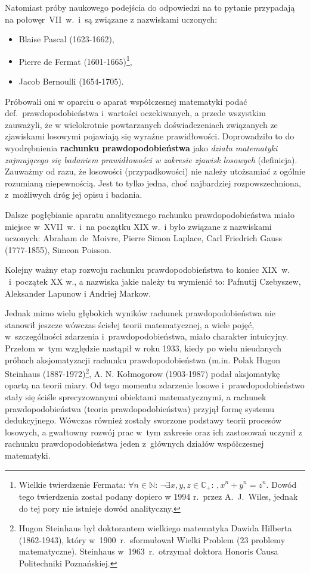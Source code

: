 \documentclass[10pt,a4paper]{article}
\begin{document}
Natomiast próby naukowego podejścia do odpowiedzi na to pytanie przypadają
na połowęr~VII~w.\ i~są związane z nazwiskami uczonych:
\begin{itemize}
  \item Blaise Pascal (1623-1662),
  \item Pierre de Fermat (1601-1665)\footnote{Wielkie twierdzenie Fermata:
      $\forall n\in\mathbb{N}:\,\neg\exists x,y,z\in\mathbb{C}_+:\,,x^n+y^n=z^n$.
      Dowód tego twierdzenia został podany dopiero w 1994 r.\ przez A.\ J.\ Wiles,
      jednak do tej pory nie istnieje dowód analityczny.},
  \item Jacob Bernoulli (1654-1705).
\end{itemize}


Próbowali oni w oparciu o aparat współczesnej matematyki podać
def.~prawdopodobieństwa i~wartości oczekiwanych, a przede wszystkim zauważyli,
że w wielokrotnie powtarzanych doświadczeniach związanych ze zjawiskami losowymi
pojawiają się wyraźne prawidłowości. Doprowadziło to do wyodrębnienia
\textbf{rachunku prawdopodobieństwa} jako \textit{działu matematyki zajmującego
  się badaniem prawidłowości w zakresie zjawisk losowych} (definicja). Zauważmy
od razu, że losowości (przypadkowości) nie należy utożsamiać z ogólnie rozumianą
niepewnością. Jest to tylko jedna, choć najbardziej rozpowszechniona,
z~możliwych dróg jej opisu i badania.

Dalsze pogłębianie aparatu analitycznego rachunku prawdopodobieństwa miało
miejsce w~XVII~w.\ i~na początku XIX w.\ i było związane z nazwiskami uczonych:
Abraham de~Moivre, Pierre Simon Laplace, Carl Friedrich Gauss (1777-1855),
Simeon Poisson.

Kolejny ważny etap rozwoju rachunku prawdopodobieństwa to koniec XIX~w.
\ i~początek XX w., a nazwiska jakie należy tu wymienić to:
Pafnutij Czebyszew, Aleksander Lapunow i Andriej Markow.

Jednak mimo wielu głębokich wyników rachunek prawdopodobieństwa nie stanowił
jeszcze wówczas ścisłej teorii matematycznej, a wiele pojęć, w~szczególności
zdarzenia i~prawdopodobieństwa, miało charakter intuicyjny. Przełom w~tym
względzie nastąpił w roku 1933, kiedy po wielu nieudanych próbach aksjomatyzacji
rachunku prawdopodobieństwa (m.in. Polak Hugon Steinhaus (1887-1972)\footnote{Hugon
Steinhaus był doktorantem wielkiego matematyka Dawida Hilberta (1862-1943),
który w~1900~r.\ sformułował Wielki Problem (23 problemy matematyczne). Steinhaus
w~1963~r.\ otrzymał doktora Honoris Causa Politechniki Poznańskiej.},
A. N. Kołmogorow (1903-1987) podał aksjomatykę opartą na teorii
miary.  Od tego momentu zdarzenie losowe i~prawdopodobieństwo stały się ściśle
sprecyzowanymi obiektami matematycznymi, a rachunek prawdopodobieństwa (teoria
prawdopodobieństwa) przyjął formę systemu dedukcyjnego. Wówczas również zostały
sworzone podstawy teorii procesów losowych, a gwałtowny rozwój prac
w~tym zakresie oraz ich zastosowań uczynił z rachunku prawdopodobieństwa jeden
z~głównych działów współczesnej matematyki.
\end{document}
